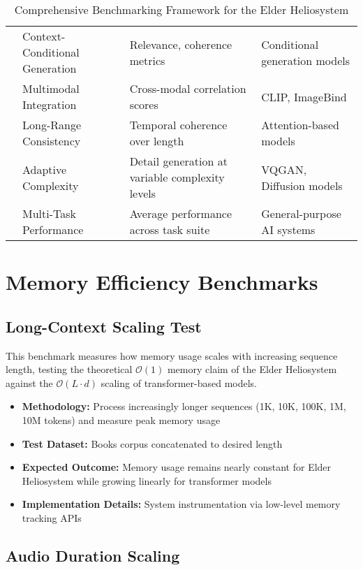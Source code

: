 \begin{table}[h]
\begin{tabular}{|p{3cm}|p{4cm}|p{4cm}|p{3cm}|}
& Context-Conditional Generation & Relevance, coherence metrics & Conditional generation models \\
\cline{2-4}
& Multimodal Integration & Cross-modal correlation scores & CLIP, ImageBind \\
\cline{2-4}
& Long-Range Consistency & Temporal coherence over length & Attention-based models \\
\cline{2-4}
& Adaptive Complexity & Detail generation at variable complexity levels & VQGAN, Diffusion models \\
\cline{2-4}
& Multi-Task Performance & Average performance across task suite & General-purpose AI systems \\
\hline
\end{tabular}
\caption{Comprehensive Benchmarking Framework for the Elder Heliosystem}
\end{table}

\section{Memory Efficiency Benchmarks}

\subsection{Long-Context Scaling Test}

This benchmark measures how memory usage scales with increasing sequence length, testing the theoretical $\mathcal{O}(1)$ memory claim of the Elder Heliosystem against the $\mathcal{O}(L \cdot d)$ scaling of transformer-based models.

\begin{itemize}
    \item \textbf{Methodology:} Process increasingly longer sequences (1K, 10K, 100K, 1M, 10M tokens) and measure peak memory usage
    \item \textbf{Test Dataset:} Books corpus concatenated to desired length
    \item \textbf{Expected Outcome:} Memory usage remains nearly constant for Elder Heliosystem while growing linearly for transformer models
    \item \textbf{Implementation Details:} System instrumentation via low-level memory tracking APIs
\end{itemize}

\subsection{Audio Duration Scaling}

